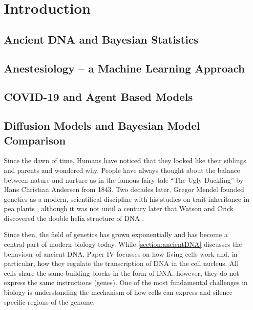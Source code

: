 
\chapter{Introduction}



\section{Ancient DNA and Bayesian Statistics}
\label{section:ancientDNA}



\section{Anestesiology -- a Machine Learning Approach }
\label{section:machine-learning}


\section{COVID-19 and Agent Based Models}
\label{section:agent-based-models}


\section{Diffusion Models and Bayesian Model Comparison}
\label{section:diffusion}

Since the dawn of time, Humans have noticed that they looked like their siblings and parents and wondered why. People have always thought about the balance between nature and nurture as in the famous fairy tale ``The Ugly Duckling'' by Hans Christian Andersen from 1843. Two decades later, Gregor Mendel founded genetics as a modern, scientifical discipline with his studies on trait inheritance in pea plants \autocite{mendelgregorVersucheUberPflanzenhybriden1866}, although it was not until a century later that Watson and Crick discovered the double helix structure of DNA \autocite{watsonMolecularStructureNucleic1953}.

Since then, the field of genetics has grown exponentially and has become a central part of modern biology today. While \autoref{section:ancientDNA} discusses the behaviour of ancient DNA, Paper IV focusses on how living cells work and, in particular, how they regulate the transcription of DNA in the cell nucleus. All cells share the same building blocks in the form of DNA, however, they do not express the same instructions (genes). One of the most fundamental challenges in biology is understanding the mechanism of how cells can express and silence specific regions of the genome.

